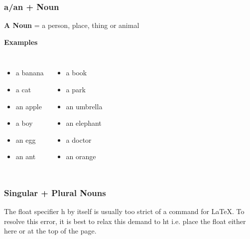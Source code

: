 \begin{frame}
	\frametitle{a/an + Noun}
	\textbf{A Noun}\; = \; a person, place, thing or animal
	\begin{center}
		\textbf{Examples}
	\end{center}
	\begin{columns}
			\begin{itemize}
				\item  a banana
				\item  a cat
				\item an apple
				\item  a boy
				\item  an egg
				\item an ant
			\end{itemize}
		\begin{itemize}
			\item  a book
			\item  a park
			\item  an umbrella
			\item  an elephant
			\item  a doctor
			\item  an orange
		\end{itemize}
	\end{columns}
\end{frame}


\begin{frame}
	\frametitle{Singular + Plural Nouns}
	The float specifier h by itself is usually too strict of a command for LaTeX. To resolve this error, it is best to relax this demand to ht i.e. place the float either here or at the top of the page. 
\end{frame}




